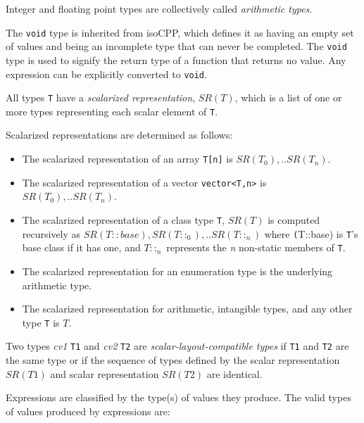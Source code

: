 \p Integer and floating point types are collectively called \textit{arithmetic
types}.

\p The \texttt{void} type is inherited from \gls{isoCPP}, which defines it as
having an empty set of values and being an incomplete type that can never be
completed. The \texttt{void} type is used to signify the return type of a
function that returns no value. Any expression can be explicitly converted to
\texttt{void}.


\p All types \texttt{T} have a \textit{scalarized representation}, \(SR(T)\),
which is a list of one or more types representing each scalar element of
\texttt{T}.

\p Scalarized representations are determined as follows:
\begin{itemize}
\item The scalarized representation of an array \texttt{T[n]} is \(SR(T_0), ..
SR(T_n)\).

\item The scalarized representation of a vector \texttt{vector<T,n>} is \(SR(T_0),
.. SR(T_n)\).

\item The scalarized representation of a class type \texttt{T}, \(SR(T)\) is
computed recursively as \(SR(T::base), SR(T::_0), .. SR(T::_n)\) where
\texttt(T::base) is \texttt{T}'s base class if it has one, and \(T::_n\)
represents the \textit{n} non-static members of \texttt{T}.

\item The scalarized representation for an enumeration type is the underlying
arithmetic type.

\item The scalarized representation for arithmetic, intangible types, and any other
type \texttt{T} is \(T\).
\end{itemize}

\p Two types \textit{cv1} \texttt{T1} and \textit{cv2} \texttt{T2} are
\textit{scalar-layout-compatible types} if \texttt{T1} and \texttt{T2} are the same
type or if the sequence of types defined by the scalar representation \(SR(T1)\)
and scalar representation \(SR(T2)\) are identical.


\p Expressions are classified by the type(s) of values they produce. The valid
types of values produced by expressions are:

